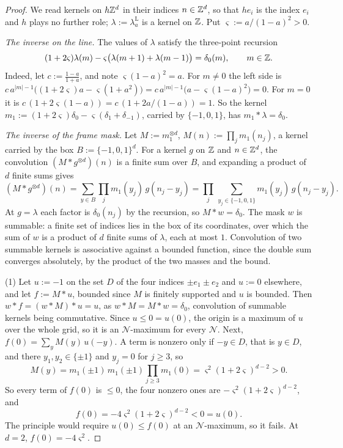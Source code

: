 \begin{proof}
We read kernels on $h\mathbb{Z}^d$ in their indices $n \in \mathbb{Z}^d$, so that $he_i$ is the index $e_i$ and
$h$ plays no further role; $\lambda := \lambda^{\mathrm L}_a$ is a kernel on $\mathbb{Z}$. Put
$\varsigma := a/(1-a)^2 > 0$.

\emph{The inverse on the line.} The values of $\lambda$ satisfy the three-point recursion
\[
(1 + 2\varsigma)\lambda(m) - \varsigma\bigl(\lambda(m+1) + \lambda(m-1)\bigr) = \delta_0(m),
\qquad m \in \mathbb{Z} .
\]
Indeed, let $c := \tfrac{1-a}{1+a}$, and note $\varsigma(1-a)^2 = a$. For $m \ne 0$ the left side
is $c\,a^{|m|-1}\bigl((1 + 2\varsigma)a - \varsigma(1 + a^2)\bigr) = c\,a^{|m|-1}\bigl(a -
\varsigma(1-a)^2\bigr) = 0$. For $m = 0$ it is $c\,(1 + 2\varsigma(1-a)) = c\,(1 + 2a/(1-a)) = 1$.
So the kernel $m_1 := (1 + 2\varsigma)\delta_0 - \varsigma(\delta_1 + \delta_{-1})$, carried by
$\{-1, 0, 1\}$, has $m_1 * \lambda = \delta_0$.

\emph{The inverse of the frame mask.} Let $M := m_1^{\otimes d}$, $M(n) := \prod_jm_1(n_j)$, a
kernel carried by the box $B := \{-1, 0, 1\}^d$. For a kernel $g$ on $\mathbb{Z}$ and $n \in \mathbb{Z}^d$, the
convolution $(M * g^{\otimes d})(n)$ is a finite sum over $B$, and expanding a product of $d$ finite
sums gives
\[
(M * g^{\otimes d})(n) = \sum_{y \in B}\prod_jm_1(y_j)\,g(n_j - y_j)
= \prod_j\,\sum_{y_j \in \{-1, 0, 1\}}m_1(y_j)\,g(n_j - y_j) .
\]
At $g = \lambda$ each factor is $\delta_0(n_j)$ by the recursion, so $M * w = \delta_0$. The mask
$w$ is summable: a finite set of indices lies in the box of its coordinates, over which the sum of
$w$ is a product of $d$ finite sums of $\lambda$, each at most $1$. Convolution of two summable
kernels is associative against a bounded function, since the double sum converges absolutely,
by the product of the two masses and the bound.

(1) Let $u := -1$ on the set $D$ of the four indices $\pm e_1 \pm e_2$ and $u := 0$ elsewhere, and
let $f := M * u$, bounded since $M$ is finitely supported and $u$ is bounded. Then
$w * f = (w * M) * u = u$, as $w * M = M * w = \delta_0$, convolution of summable kernels being
commutative. Since $u \le 0 = u(0)$, the origin is a maximum of $u$ over the whole
grid, so it is an $\mathcal{N}$-maximum for every $\mathcal{N}$. Next,
$f(0) = \sum_yM(y)\,u(-y)$. A term is nonzero only if $-y \in D$, that is $y \in D$, and there
$y_1, y_2 \in \{\pm1\}$ and $y_j = 0$ for $j \ge 3$, so
\[
M(y) = m_1(\pm1)\,m_1(\pm1)\prod_{j \ge 3}m_1(0) = \varsigma^2(1 + 2\varsigma)^{d-2} > 0 .
\]
So every term of $f(0)$ is $\le 0$, the four nonzero ones are $-\varsigma^2(1 + 2\varsigma)^{d-2}$,
and
\[
f(0) = -4\varsigma^2(1 + 2\varsigma)^{d-2} < 0 = u(0) .
\]
The principle would require $u(0) \le f(0)$ at an $\mathcal{N}$-maximum, so it fails. At $d = 2$,
$f(0) = -4\varsigma^2$.


\end{proof}

